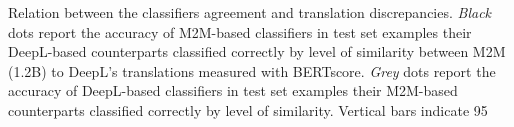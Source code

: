 Relation between the classifiers agreement and translation discrepancies. \emph{Black} dots report the accuracy of M2M-based classifiers in test set examples their DeepL-based counterparts classified correctly by level of similarity between M2M (1.2B) to DeepL's translations measured with BERTscore. \emph{Grey} dots report the accuracy of DeepL-based classifiers in test set examples their M2M-based counterparts classified correctly by level of similarity. Vertical bars indicate 95%
